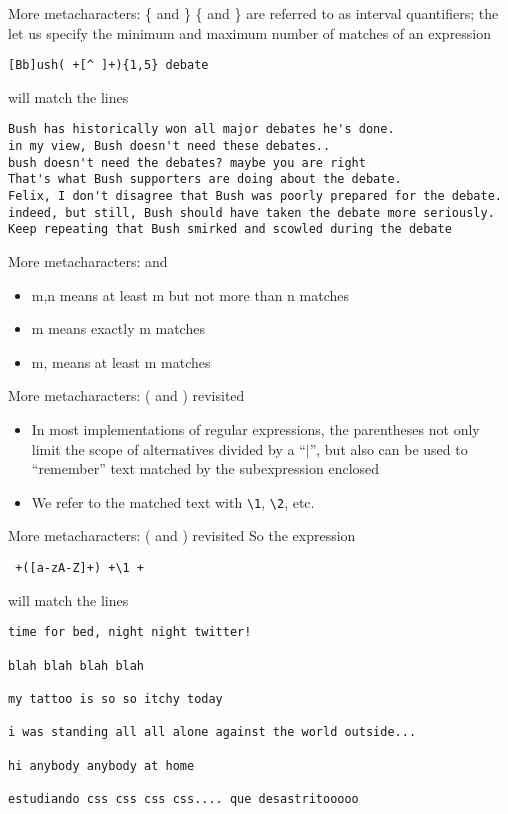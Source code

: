 \documentclass[aspectratio=169]{beamer}
\begin{document}
\begin{frame}[fragile]{More metacharacters: \{ and \}}
\{ and \} are referred to as interval quantifiers; the let us specify
the minimum and maximum number of matches of an expression
\begin{verbatim}
[Bb]ush( +[^ ]+){1,5} debate
\end{verbatim}
will match the lines 
\begin{verbatim}
Bush has historically won all major debates he's done. 
in my view, Bush doesn't need these debates..
bush doesn't need the debates? maybe you are right 
That's what Bush supporters are doing about the debate. 
Felix, I don't disagree that Bush was poorly prepared for the debate.
indeed, but still, Bush should have taken the debate more seriously.
Keep repeating that Bush smirked and scowled during the debate 
\end{verbatim}
\end{frame}

\begin{frame}[fragile]{More metacharacters: { and }}
\begin{itemize}
\item
{m,n} means at least m but not more than n matches
\item
{m} means exactly m matches
\item
{m,} means at least m matches
\end{itemize}
\end{frame}

\begin{frame}[fragile]{More metacharacters: ( and ) revisited}
\begin{itemize}
\item
In most implementations of regular expressions, the parentheses not
only limit the scope of alternatives divided by a ``$|$'', but also
can be used to ``remember'' text matched by the subexpression enclosed
\item
We refer to the matched text with \verb+\1+, \verb+\2+, etc.
\end{itemize}
\end{frame}

\begin{frame}[fragile]{More metacharacters: ( and ) revisited}
So the expression 
\begin{verbatim}
 +([a-zA-Z]+) +\1 +
\end{verbatim}
will match the lines 
\begin{verbatim}
time for bed, night night twitter!

blah blah blah blah 

my tattoo is so so itchy today

i was standing all all alone against the world outside...

hi anybody anybody at home

estudiando css css css css.... que desastritooooo
\end{verbatim}
\end{frame}
\end{document}
